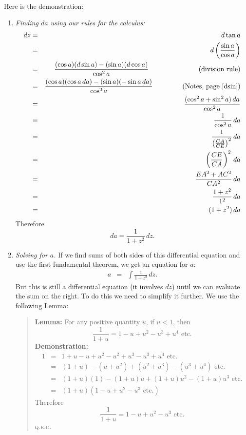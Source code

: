 \documentclass[twoside,openright]{article}
\begin{document}
Here is the demonstration:
\begin{enumerate}
\item {\em Finding $da$ using our rules for the calculus:}
  \setlength{\jot}{2ex}
  \begin{eqnarray*}
    dz & = & d\tan a \\
       & = & d\left(\frac{\sin a}{\cos a}\right) \\
       & = & \frac{(\cos a)(d\sin a) - (\sin a)(d\cos a)}{\cos^2 a}\mbox{\hspace{7em} (division rule)}\\
       & = & \frac{(\cos a)(\cos a\,da) - (\sin a)(-\sin
             a\,da)}{\cos^2 a}\mbox{\hspace{4em} (Notes,
             page~\pageref{dsin})}\\ 
       & = & \frac{(\cos^2 a + \sin^2 a)\,da}{\cos^2 a} \\
       & = & \frac{1}{\cos^2 a}\,da\\
       & = & \frac{1}{\left(\frac{CA}{CE}\right)^2}\,da\\
       & = & \left(\frac{CE}{CA}\right)^2\,da\\
       & = & \frac{EA^2 + AC^2}{CA^2}\,da\\
       & = & \frac{1+z^2}{1^2}\,da\\
       & = & (1+z^2)\,da
  \end{eqnarray*}
  Therefore
$$da = \frac{1}{1+z^2}\,dz.$$

\item {\em Solving for $a$.} If we find sums of both sides of this
  differential equation and use the first fundamental theorem, we get
  an equation for $a$: \setcounter{equation}{0}
  \begin{eqnarray}
    \label{ainteq} a &  = & \int\!\frac{1}{1 + z^2}\,dz.
  \end{eqnarray}
  But this is still a differential equation (it involves $dz$) until
  we can evaluate the sum on the right.  To do this we need to
  simplify it further.  We use the following Lemma:
  \begin{quote} {\bf Lemma:}\label{sumlemma} For any positive quantity
    $u$, if $u<1$, then
$$\frac{1}{1+ u} = 1 - u + u^2 - u^3 + u^4 \mbox{ etc.}$$
{\bf Demonstration:} \setlength{\jot}{1.5ex}
\begin{eqnarray*}
  1 & =  & 1 + u - u + u^2 - u^2  +u^3 - u^3 + u^4 \mbox{ etc.}\\
    & = & (1+u) - (u+ u^2) + (u^2 + u^3) - (u^3 + u^4) \mbox{ etc.}\\
    & = & (1+u)(1) - (1+u)u + (1+u)u^2 - (1+u)u^3 \mbox{ etc.}\\
    & = & (1+u)(1 - u + u^2 -u^3 \mbox{ etc.})
\end{eqnarray*}
Therefore
 $$\frac{1}{1+u} = 1 -u +u^2 - u^3 \mbox{ etc.}$$
 \textsc{q.e.d.}


\end{quote}
\end{enumerate}
\end{document}
